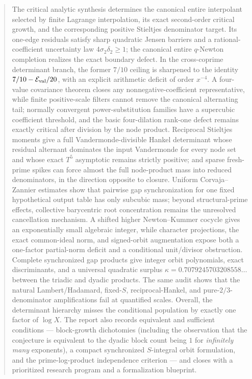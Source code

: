 \documentclass[11pt,oneside]{article}
\theoremstyle{definition}
\theoremstyle{remark}
\begin{document}
\begin{abstract}
The critical analytic synthesis determines the canonical entire interpolant selected by
finite Lagrange interpolation, its exact second-order critical growth, and the corresponding
positive Stieltjes denominator target.  Its one-edge residuals satisfy sharp quadratic
Jensen barriers and a rational-coefficient uncertainty law $4\sigma_2\delta_2\ge1$; the
canonical entire $q$-Newton completion realizes the exact boundary defect.  In the
cross-coprime determinant branch, the former $7/10$ ceiling is sharpened to the identity
$7/10-\mathcal E_{\rm val}/20$, with an explicit arithmetic deficit of order $x^{-4}$.
A four-value covariance theorem closes any nonnegative-coefficient representative, while
finite positive-scale filters cannot remove the canonical alternating tail; normally
convergent power-substitution families have a supercubic coefficient threshold, and the
basic four-dilation rank-one defect remains exactly critical after division by the node
product.  Reciprocal
Stieltjes moments give a full Vandermonde-divisible Hankel determinant whose residual
alternant dominates the input Vandermonde for every node set and whose exact $T^5$ asymptotic
remains strictly positive; and sparse fresh-prime spikes can force almost the full node-product mass
into reduced denominators, in the direction opposite to closure.  Uniform
Corvaja--Zannier estimates show that pairwise gap synchronization for one fixed hypothetical
output table has only subcubic mass; beyond structural-prime effects, collective barycentric
root concentration remains the unresolved cancellation mechanism.  A shifted higher
Newton--Kummer cocycle gives an exponentially small algebraic integer, while character
projections, the exact common-ideal norm, and signed-orbit augmentation expose both a
one-factor partial-norm deficit and a conditional unit/divisor obstruction.
Complete synchronized gap products give integer orbit polynomials, exact
discriminants, and a universal quadratic surplus
$\kappa=0.7079245703208558\ldots$ between the triadic and dyadic products.  The same audit
shows that the natural Lambert/Hadamard, fixed-$S$,
reciprocal-Hankel, and pure-$2/3$-denominator amplifications fail at quantified scales.
Overall, the determinant hierarchy misses the conditional population by
exactly one factor of $\log X$.
The report also records equivalent and sufficient conditions --- block-growth dichotomies
(including the observation that the conjecture is equivalent to the dyadic block count being
$1$ for \emph{infinitely many} exponents), a compact synchronized $S$-integral orbit
formulation, and the prime-log-product independence criterion --- and closes with a
prioritized research program and a formalization blueprint.
\end{abstract}
\end{document}

